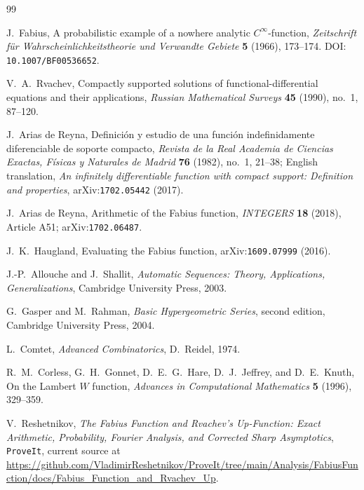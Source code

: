 \documentclass[11pt,oneside]{article}
\numberwithin{equation}{section}
\theoremstyle{definition}
\theoremstyle{remark}
\begin{document}
\begin{thebibliography}{99}

J.~Fabius,
\newblock A probabilistic example of a nowhere analytic $C^\infty$-function,
\newblock \emph{Zeitschrift f\"ur Wahrscheinlichkeitstheorie und Verwandte Gebiete}
\textbf{5} (1966), 173--174.
\newblock DOI: \nolinkurl{10.1007/BF00536652}.

V.~A.~Rvachev,
\newblock Compactly supported solutions of functional-differential equations and their applications,
\newblock \emph{Russian Mathematical Surveys} \textbf{45} (1990), no.~1, 87--120.

J.~Arias de Reyna,
\newblock Definici\'on y estudio de una funci\'on indefinidamente diferenciable de soporte compacto,
\newblock \emph{Revista de la Real Academia de Ciencias Exactas, F\'isicas y Naturales de Madrid}
\textbf{76} (1982), no.~1, 21--38;
English translation, \emph{An infinitely differentiable function with compact support: Definition and properties}, arXiv:\nolinkurl{1702.05442} (2017).

J.~Arias de Reyna,
\newblock Arithmetic of the Fabius function,
\newblock \emph{INTEGERS} \textbf{18} (2018), Article A51;
arXiv:\nolinkurl{1702.06487}.

J.~K.~Haugland,
\newblock Evaluating the Fabius function,
\newblock arXiv:\nolinkurl{1609.07999} (2016).

J.-P.~Allouche and J.~Shallit,
\newblock \emph{Automatic Sequences: Theory, Applications, Generalizations},
\newblock Cambridge University Press, 2003.

G.~Gasper and M.~Rahman,
\newblock \emph{Basic Hypergeometric Series}, second edition,
\newblock Cambridge University Press, 2004.

L.~Comtet,
\newblock \emph{Advanced Combinatorics},
\newblock D.~Reidel, 1974.

R.~M.~Corless, G.~H.~Gonnet, D.~E.~G.~Hare, D.~J.~Jeffrey, and D.~E.~Knuth,
\newblock On the Lambert $W$ function,
\newblock \emph{Advances in Computational Mathematics} \textbf{5} (1996), 329--359.

V.~Reshetnikov,
\newblock \emph{The Fabius Function and Rvachev's Up-Function: Exact Arithmetic,
Probability, Fourier Analysis, and Corrected Sharp Asymptotics},
\newblock \texttt{ProveIt}, current source at
\url{https://github.com/VladimirReshetnikov/ProveIt/tree/main/Analysis/FabiusFunction/docs/Fabius_Function_and_Rvachev_Up}.


\end{thebibliography}
\end{document}
